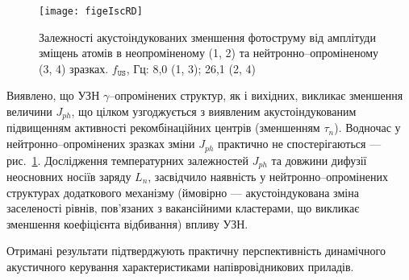 \begin{figure}[ht]
\center
\texttt{[image: figeIscRD]}
\caption{\label{figeIscRD}
Залежності акустоіндукованих зменшення фотоструму від
амплітуди зміщень атомів в неопроміненому (1, 2)
та нейтронно--опроміненому (3, 4) зразках.
$f_\mathtt{US}$, Гц: 8,0 (1, 3);
26,1 (2, 4)
}%
\end{figure}
Виявлено, що УЗН $\gamma$--опромінених структур, як і вихідних, викликає зменшення величини $J_{ph}$, що цілком
узгоджується з виявленим акустоіндукованим підвищенням активності рекомбінаційних центрів (зменшенням $\tau_n$).
Водночас у нейтронно--опромінених зразках зміни $J_{ph}$ практично не спостерігаються --- рис.~\ref{figeIscRD}.
Дослідження температурних залежностей $J_{ph}$ та довжини дифузії неосновних носіїв заряду $L_n$,
засвідчило наявність у нейтронно--опромінених структурах додаткового механізму (ймовірно --- акустоіндукована зміна заселеності рівнів, пов'язаних з вакансійними кластерами, що викликає зменшення коефіцієнта відбивання) впливу УЗН.

Отримані   результати  підтверджують  практичну перспективність динамічного акустичного керування характеристиками напівровідникових приладів.


